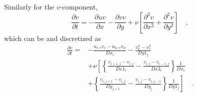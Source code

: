 \documentclass[12pt,a4paper,fleqn]{article}
\begin{document}
Similarly for the $v$-component,
\begin{equation} \label{eq:convective-diffusive-v}
\frac{\partial v}{\partial t} = -\frac{\partial uv}{\partial x} -\frac{\partial vv}{\partial y} + \nu\left[\frac{\partial^2v}{\partial x^2} + \frac{\partial^2v}{\partial y^2}\right] \quad ,
\end{equation}
which can be and discretized as
\begin{align}\label{eq:discretized_convective-diffusive-v}
    \frac{\partial v}{\partial t} =
    {}& - \frac{u_{e,v} v_e - u_{w,v} v_w}{Dx_i} - \frac{v_n^2 - v_s^2}{Dy1_j} \nonumber\\
    & + \nu\left[
    \left\{
    \frac{v_{i+1,j}-v_{i,j}}{Dx1_i}
    - \frac{v_{i,j}-v_{i-1,j}}{Dx2_i}
    \right\}
    \frac{1}{Dx_i}
    \right.\nonumber\\
    & \left. + \left\{
    \frac{v_{i,j+1}-v_{i,j}}{Dy_{j+1}}
    - \frac{v_{i,j}-v_{i,j-1}}{Dy_j}
    \right\}
    \frac{1}{Dy1_j}
    \right] \quad .
\end{align}
\end{document}
